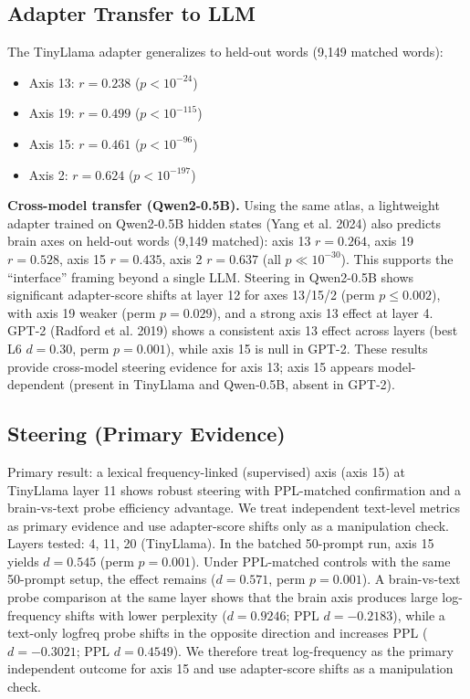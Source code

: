 \documentclass[
]{article}
\begin{document}
\subsection{Adapter Transfer to LLM}\label{adapter-transfer-to-llm}

The TinyLlama adapter generalizes to held-out words (9,149 matched
words):

\begin{itemize}
\item
  Axis 13: \(r=0.238\) (\(p<10^{-24}\))
\item
  Axis 19: \(r=0.499\) (\(p<10^{-115}\))
\item
  Axis 15: \(r=0.461\) (\(p<10^{-96}\))
\item
  Axis 2: \(r=0.624\) (\(p<10^{-197}\))
\end{itemize}

\textbf{Cross-model transfer (Qwen2-0.5B).} Using the same atlas, a
lightweight adapter trained on Qwen2-0.5B hidden states (Yang et al.
2024) also predicts brain axes on held-out words (9,149 matched): axis
13 \(r=0.264\), axis 19 \(r=0.528\), axis 15 \(r=0.435\), axis 2
\(r=0.637\) (all \(p\ll 10^{-30}\)). This supports the ``interface''
framing beyond a single LLM. Steering in Qwen2-0.5B shows significant
adapter-score shifts at layer 12 for axes 13/15/2 (perm \(p\leq0.002\)),
with axis 19 weaker (perm \(p=0.029\)), and a strong axis 13 effect at
layer 4. GPT-2 (Radford et al. 2019) shows a consistent axis 13 effect
across layers (best L6 \(d=0.30\), perm \(p=0.001\)), while axis 15 is
null in GPT-2. These results provide cross-model steering evidence for
axis 13; axis 15 appears model-dependent (present in TinyLlama and
Qwen‑0.5B, absent in GPT‑2).

\subsection{Steering (Primary
Evidence)}\label{steering-primary-evidence}

Primary result: a lexical frequency-linked (supervised) axis (axis 15)
at TinyLlama layer 11 shows robust steering with PPL-matched
confirmation and a brain‑vs‑text probe efficiency advantage. We treat
independent text-level metrics as primary evidence and use adapter-score
shifts only as a manipulation check. Layers tested: 4, 11, 20
(TinyLlama). In the batched 50-prompt run, axis 15 yields \(d=0.545\)
(perm \(p=0.001\)). Under PPL-matched controls with the same 50-prompt
setup, the effect remains (\(d=0.571\), perm \(p=0.001\)). A
brain-vs-text probe comparison at the same layer shows that the brain
axis produces large log-frequency shifts with lower perplexity
(\(d=0.9246\); PPL \(d=-0.2183\)), while a text-only logfreq probe
shifts in the opposite direction and increases PPL (\(d=-0.3021\); PPL
\(d=0.4549\)). We therefore treat log-frequency as the primary
independent outcome for axis 15 and use adapter-score shifts as a
manipulation check.
\end{document}
